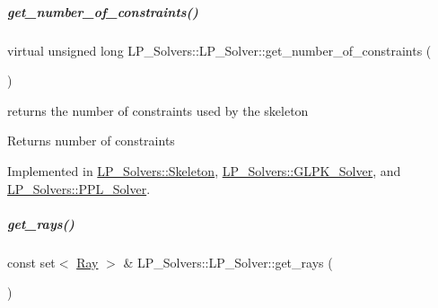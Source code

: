 \mbox{\label{group___c_l_s_solvers_a05697a4527b15e26b5e0ae9088a46ed5}} 
\subparagraph{\texorpdfstring{get\+\_\+number\+\_\+of\+\_\+constraints()}{get\_number\_of\_constraints()}}
{\footnotesize\ttfamily virtual unsigned long L\+P\+\_\+\+Solvers\+::\+L\+P\+\_\+\+Solver\+::get\+\_\+number\+\_\+of\+\_\+constraints (\begin{DoxyParamCaption}{ }\end{DoxyParamCaption})\hspace{0.3cm}{\ttfamily [pure virtual]}}



returns the number of constraints used by the skeleton 

\begin{DoxyReturn}{Returns}
number of constraints 
\end{DoxyReturn}


Implemented in \hyperlink{group___c_l_s_solvers_a1fcb6873ce96085aa68f97064cd90c9d}{L\+P\+\_\+\+Solvers\+::\+Skeleton}, \hyperlink{group___c_l_s_solvers_acf743e235ac0476d8d739b139f76a0af}{L\+P\+\_\+\+Solvers\+::\+G\+L\+P\+K\+\_\+\+Solver}, and \hyperlink{group___c_l_s_solvers_a8c8dbe226a971e62159888aecacce458}{L\+P\+\_\+\+Solvers\+::\+P\+P\+L\+\_\+\+Solver}.

\mbox{\label{group___c_l_s_solvers_a52f7a4068e9d36500d1dcdf35757cd06}} 
\subparagraph{\texorpdfstring{get\+\_\+rays()}{get\_rays()}}
{\footnotesize\ttfamily const set$<$ \hyperlink{group___c_l_s_solvers_class_l_p___solvers_1_1_ray}{Ray} $>$ \& L\+P\+\_\+\+Solvers\+::\+L\+P\+\_\+\+Solver\+::get\+\_\+rays (\begin{DoxyParamCaption}{ }\end{DoxyParamCaption})\hspace{0.3cm}{\ttfamily [virtual]}}



